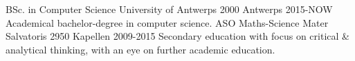 
\begin{cventries}
  \cventry
    {BSc. in Computer Science} %
    {University of Antwerps} %
    {2000 Antwerps} %
    {2015-NOW} %
    { Academical bachelor-degree in computer science. }
  \cventry
    {ASO Maths-Science} %
    {Mater Salvatoris} %
    {2950 Kapellen} %
    {2009-2015} %
    { Secondary education with focus on critical \& analytical thinking, with an eye on further academic education.}
\end{cventries}